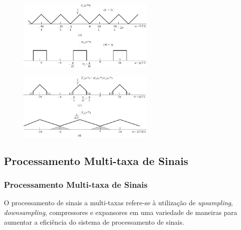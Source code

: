 \begin{frame}[allowframebreaks]
\begin{example}
  \examplebreak

        \begin{figure}[h!]
        \centering
        \includegraphics[width=0.6\textwidth]{images/fig430cd.pdf}
        \label{fig:fig430cd}
        \end{figure}

  \examplebreak

        \begin{figure}[h!]
        \centering
        \includegraphics[width=0.6\textwidth]{images/fig430ef.pdf}
        \label{fig:fig430ef}
        \end{figure}

  \end{example}
\end{frame}

\subsection{Processamento Multi-taxa de Sinais}
\begin{frame}[allowframebreaks]
  \frametitle{Processamento Multi-taxa de Sinais}
  O processamento de sinais a multi-taxas refere-se à utilização de \textit{upsampling},
  \textit{downsampling}, compressores e expansores em uma variedade de maneiras para
  aumentar a eficiência do sistema de processamento de sinais.
\end{frame}

